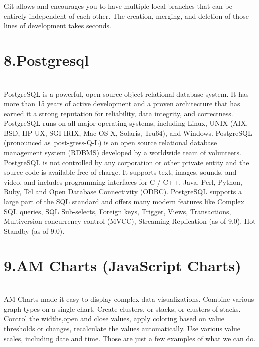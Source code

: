 Git allows and encourages you to have multiple local branches that can be entirely independent of each other. The creation, merging, and deletion of those lines of development takes seconds.\\

\chapter{\textbf{8.Postgresql}}\\
PostgreSQL is a powerful, open source object-relational database system. It has more than 15 years of active development and a proven architecture that has earned it a strong reputation for reliability, data integrity, and correctness. PostgreSQL runs on all major operating systems, including Linux, UNIX (AIX, BSD, HP-UX, SGI IRIX, Mac OS X, Solaris, Tru64), and Windows. PostgreSQL (pronounced as post-gress-Q-L) is an open source relational database management system (RDBMS) developed by a worldwide team of volunteers. PostgreSQL is not controlled by any corporation or other private entity and the source code is available free of charge. It supports text, images, sounds, and video, and includes programming interfaces for C / C++, Java, Perl, Python, Ruby, Tcl and Open Database Connectivity (ODBC). PostgreSQL supports a large part of the SQL standard and offers many modern features like Complex SQL queries, SQL Sub-selects, Foreign keys, Trigger, Views, Transactions, Multiversion concurrency control (MVCC), Streaming Replication (as of 9.0), Hot Standby (as of 9.0).

\chapter{\textbf{9.AM Charts (JavaScript Charts)}}\\
AM Charts made it easy to display complex data visualizations. Combine various graph types on a single chart. Create clusters, or stacks, or clusters of stacks. Control the widths,open and close values, apply coloring based on value thresholds or changes, recalculate the values automatically. Use various value scales, including date and time. Those are just a few examples of what we can do.

